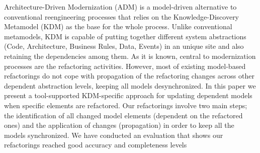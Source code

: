 %
Architecture-Driven Modernization (ADM) is a model-driven alternative to conventional reengineering processes that relies on the Knowledge-Discovery Metamodel (KDM) as the base for the whole process. Unlike conventional metamodels, KDM is capable of putting together different system abstractions (Code, Architecture, Business Rules, Data, Events) in an unique site and also retaining the dependencies among them. As it is known, central to modernization processes are the refactoring activities. However, most of existing model-based refactorings do not cope with propagation of the refactoring changes across other dependent abstraction levels, keeping all models desynchronized. In this paper we present a tool-supported KDM-specific approach for updating dependent models when specific elements are refactored. Our refactorings involve two main steps; the identification of all changed model elements (dependent on the refactored ones) and the application of changes (propagation) in order to keep all the models synchronized. We have conducted an evaluation that shows our refactorings reached good accuracy and completeness levels




